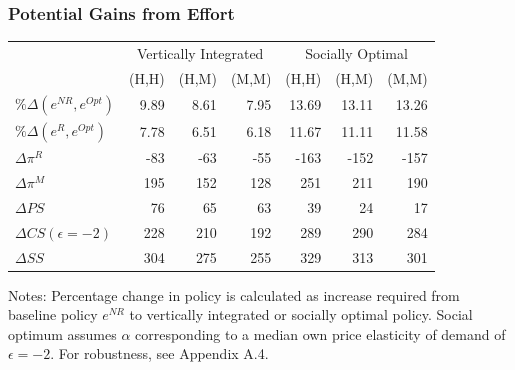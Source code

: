 \documentclass[aspectratio=169,11pt]{beamer}
\begin{document}
\begin{frame}
\frametitle{Potential Gains from Effort}
\begin{table}[htp]
\begin{center}
\begin{tabular}{|l | r r r | r r r |}
\hline
&  \multicolumn{3}{c|}{Vertically Integrated}& \multicolumn{3}{c|}{Socially Optimal}\\ 
 & (H,H) & (H,M) & (M,M)  & (H,H) & (H,M) & (M,M) \\ \hline
$\%\Delta(e^{NR}, e^{Opt})$ & 9.89 & 8.61 & 7.95 & 13.69 & 13.11 & 13.26 \\
$\%\Delta(e^{R}, e^{Opt})$ & 7.78 & 6.51 & 6.18 & 11.67 & 11.11 & 11.58 
 \\ \hline
$\Delta \pi^R$ & -83 & -63 & -55 & -163 & -152 & -157 \\
$\Delta \pi^M$ & 195 & 152 & 128 & 251 & 211 & 190 \\
$\Delta PS$ & 76 & 65 & 63 & 39 & 24 & 17 \\
$\Delta CS  (\epsilon=-2)$ & 228 & 210 & 192 & 289 & 290 & 284 \\
$\Delta SS$ & 304 & 275 & 255 & 329 & 313 & 301 \\ \hline
\end{tabular} 
\end{center}
\label{tab:effortnew}
\footnotesize
Notes: Percentage change in policy is calculated as increase required from baseline policy $e^{NR}$ to vertically integrated or socially optimal policy. Social optimum assumes $\alpha$ corresponding to a median own price elasticity of demand of $\epsilon=-2$. For robustness, see Appendix A.4.
\end{table}
\end{frame}
\end{document}
